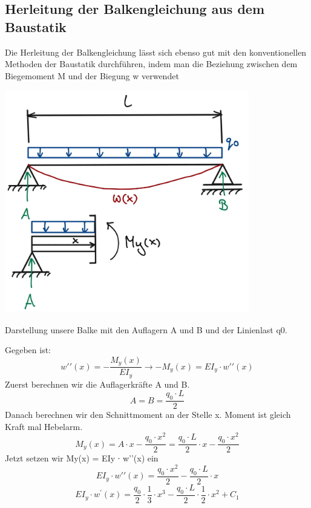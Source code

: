 \subsection{Herleitung der Balkengleichung aus dem Baustatik}
Die Herleitung der Balkengleichung lässt sich ebenso gut mit den konventionellen Methoden der Baustatik durchführen, indem man die Beziehung zwischen dem Biegemoment M und der Biegung w verwendet
\begin{center}
	\includegraphics[width=0.8\textwidth]{papers/balken/images/teil2/HerleitungBaustatik.jpg}
\end{center}
\caption{Darstellung unsere Balke mit den Auflagern A und B und der Linienlast q0.}
Gegeben ist:
\begin{equation}
	w\prime\prime(x)=
	-\frac{M_y(x)}{EI_y}
	\rightarrow-M_y(x)=
	EI_y\cdot w\prime\prime(x)
\end{equation}
Zuerst berechnen wir die Auflagerkräfte A und B.
\begin{equation}
	A=
	B=
	\frac{q_0\cdot L}{2}
\end{equation}
Danach berechnen wir den Schnittmoment an der Stelle x.
Moment ist gleich Kraft mal Hebelarm.
\begin{equation}
	M_y(x)=
	A\cdot x-\frac{q_0\cdot x^2}{2}=
	\frac{q_0\cdot L}{2}\cdot x-\frac{q_0\cdot x^2}{2}
\end{equation}
Jetzt setzen wir My(x) = EIy ∙ w’’(x) ein
\begin{equation}
	EI_y\cdot w\prime\prime(x)=
	\frac{q_0\cdot x^2}{2}-\frac{q_0\cdot L}{2}\cdot x
\end{equation}
\begin{equation}
	EI_y\cdot w^\prime\left(x\right)=
	\frac{q_0}{2}\cdot\frac{1}{3}\cdot x^3-\frac{q_0\cdot L}{2}\cdot\frac{1}{2}\cdot x^2+C_1
\end{equation}
